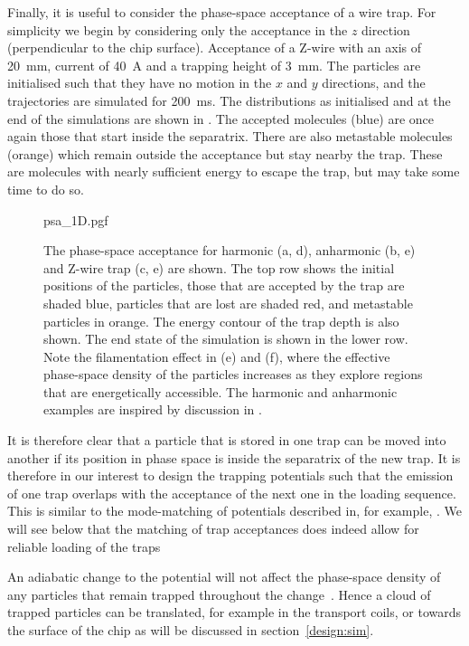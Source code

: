 Finally, it is useful to consider the phase-space acceptance of a wire trap.
For simplicity we begin by considering only the acceptance in the $z$ direction
(perpendicular to the chip surface). Acceptance of a Z-wire with an axis of
\SI{20}{\milli\meter}, current of \SI{40}{\ampere} and a trapping height of
\SI{3}{\milli\meter}. The particles are initialised such that they have no
motion in the $x$ and $y$ directions, and the trajectories are simulated for
\SI{200}{\milli\second}. The distributions as initialised and at the end of the
simulations are shown in . The accepted
molecules (blue) are once again those that start inside the separatrix. There are
also metastable molecules (orange) which remain outside the acceptance but stay
nearby the trap. These are molecules with nearly sufficient energy to escape
the trap, but may take some time to do so.

\begin{figure}[htb]
  \centering
  {psa_1D.pgf}
  \caption{
    The phase-space acceptance for harmonic (a, d), anharmonic (b, e) and
    Z-wire trap (c, e) are shown. The top row shows the initial positions of
    the particles, those that are accepted by the trap are shaded blue,
    particles that are lost are shaded red, and metastable particles in orange.
    The energy contour of the trap depth is also shown. The end state of the
    simulation is shown in the lower row. Note the filamentation effect in (e)
    and (f), where the effective phase-space density of the particles increases
    as they explore regions that are energetically accessible. The harmonic and
    anharmonic examples are inspired by discussion in
    .
  }
  \label{design:fig:psaeg}
\end{figure}

It is therefore clear that a particle that is stored in one trap can be moved
into another if its position in phase space is inside the separatrix of the new
trap. It is therefore in our interest to design the trapping potentials such
that the emission of one trap overlaps with the acceptance of the next one in
the loading sequence. This is similar to the mode-matching of potentials
described in, for example, . We will see below that the
matching of trap acceptances does indeed allow for reliable loading of the
traps

An adiabatic change to the potential will not affect the phase-space density of
any particles that remain trapped throughout the change~\cite{Hand1998,
Lichtenberg1969}. Hence a cloud of trapped particles can be translated, for
example in the transport coils, or towards the surface of the chip as will be
discussed in section~\ref{design:sim}.

